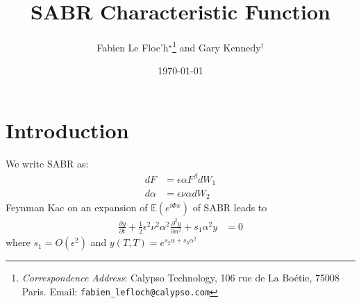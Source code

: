 \documentclass[]{rAMF2e}
\begin{document}
\doi{}
\issn{}  \issnp{}
\def\jobtag{}
\jname{}


\title{SABR Characteristic Function}
\author{Fabien {Le Floc'h}$^\star$\thanks{{\em{Correspondence Address}}: Calypso Technology, 106 rue de La Bo\'{e}tie, 75008 Paris. Email: \texttt{fabien\_lefloch@calypso.com} \vspace{6pt}} and Gary Kennedy$^\dag$}
%
\date{\today}

\maketitle
\newcommand{\sgn}{\mathop{\mathrm{sgn}}}

\section{Introduction}
We write SABR as:
\begin{align}
dF &= \epsilon \alpha F^{\beta} dW_1 \\
d\alpha &= \epsilon \nu \alpha dW_2 
\end{align}
Feynman Kac on an expansion of $\mathbb{E}(e^{i\Phi x})$ of SABR leads to
\begin{align}
\frac{\partial y}{\partial t} + \frac{1}{2}\epsilon^2\nu^2\alpha^2 \frac{\partial^2 y}{\partial  \alpha^2} + s_1 \alpha^2 y &= 0
\end{align}
where $s_1 = O(\epsilon^2)$ and $y(T,T) = e^{s_2 \alpha + s_3 \alpha^2}$
\end{document}
